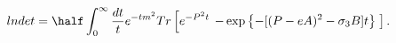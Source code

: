 \begin{equation}
\label{Eq_0506}
lndet = \half \int^{\infty}_0 \frac{dt}{t} e^{-tm^2} Tr
  \left[
  e^{-P^2 t}
  \right.
  \left.
  - \exp\left\{-[(P-eA)^2 - \sigma_3 B]t\right\} \;
  \right].
\end{equation}

